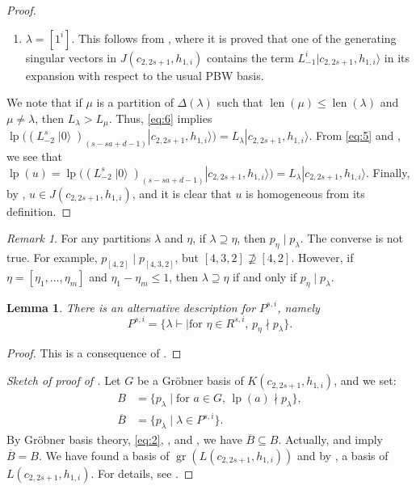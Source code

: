 \documentclass[a4paper, 12pt, reqno]{amsart}
\newtheorem{lemma}[theorem]{Lemma}
\theoremstyle{remark}
\newtheorem{remark}[theorem]{Remark}
\DeclareMathOperator{\len}{len}
\DeclareMathOperator{\vac}{|0\rangle}
\DeclareMathOperator{\gr}{gr}
\DeclareMathOperator{\lp}{lp}
\begin{document}
\begin{proof}
\begin{enumerate}
\begin{description}[leftmargin = !]
      Since $\binom{s - 1}{d - 1} + \binom{s - 1}{d} = \binom{s}{d}$, we obtain \eqref{eq:6}.
    \end{description}
  \item $\lambda = [1^i]$.
    This follows from \cite{benoit_degenerate_1988}, where it is proved that one of the generating singular vectors in $J(c_{2, 2s + 1}, h_{1, i})$ contains the term $L_{-1}^i|c_{2, 2s + 1}, h_{1, i}\rangle$ in its expansion with respect to the usual PBW basis.
  \end{enumerate}
  We note that if $\mu$ is a partition of $\Delta(\lambda)$ such that $\len(\mu) \le \len(\lambda)$ and $\mu \neq \lambda$, then $L_{\lambda} > L_{\mu}$.
  Thus, \eqref{eq:6} implies $\lp((L_{-2}^s\vac)_{(s - sa + d - 1)}|c_{2, 2s + 1}, h_{1, i}\rangle) = L_{\lambda}|c_{2, 2s + 1}, h_{1, i}\rangle$.
  From \eqref{eq:5} and , we see that $\lp(u) = \lp((L_{-2}^s\vac)_{(s - sa + d - 1)}|c_{2, 2s + 1}, h_{1, i}\rangle) = L_{\lambda}|c_{2, 2s + 1}, h_{1, i}\rangle$.
  Finally, by , $u \in J(c_{2, 2s + 1}, h_{1, i})$, and it is clear that $u$ is homogeneous from its definition.
\end{proof}

\begin{remark}
  \label{rmk:5}
  For any partitions $\lambda$ and $\eta$, if $\lambda \supseteq \eta$, then $p_{\eta} \mid p_{\lambda}$.
  The converse is not true.
  For example, $p_{[4, 2]} \mid p_{[4, 3, 2]}$, but $[4, 3, 2] \nsupseteq [4, 2]$.
  However, if $\eta = [\eta_1, \dots, \eta_m]$ and $\eta_1 - \eta_m \le 1$, then $\lambda \supseteq \eta$ if and only if $p_{\eta} \mid p_{\lambda}$.
\end{remark}

\begin{lemma}
  \label{lmm:11}
  There is an alternative description for $P^{s, i}$, namely
  \begin{equation*}
    P^{s, i} = \{\lambda \vdash \mid \text{for $\eta \in R^{s, i}$, $p_{\eta} \nmid p_{\lambda}$}\}.
  \end{equation*}
\end{lemma}

\begin{proof}
  This is a consequence of .
\end{proof}

\begin{proof}[Sketch of proof of ]
  Let $G$ be a Gröbner basis of $K(c_{2, 2s + 1}, h_{1, i})$, and we set:
  \begin{align*}
    B &= \{p_{\lambda} \mid \text{for $a \in G$, $\lp(a) \nmid p_{\lambda}$}\}, \\
    \overline{B} &= \{p_{\lambda} \mid \lambda \in P^{s, i}\}.
  \end{align*}
  By Gröbner basis theory, \eqref{eq:2}, ,  and , we have $\overline{B} \subseteq B$.
  Actually,  and  imply $\overline{B} = B$.
  We have found a basis of $\gr(L(c_{2, 2s + 1}, h_{1, i}))$ and by , a basis of $L(c_{2, 2s + 1}, h_{1, i})$.
  For details, see \cite{salazar_pbw_2024}.
\end{proof}
\end{document}
